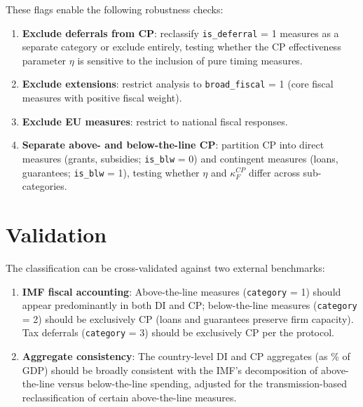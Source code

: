 \documentclass[12pt,a4paper]{article}
\begin{document}
\noindent These flags enable the following robustness checks:

\begin{enumerate}[leftmargin=2em]
  \item \textbf{Exclude deferrals from CP}: reclassify \texttt{is\_deferral} = 1
    measures as a separate category or exclude entirely, testing whether the CP
    effectiveness parameter $\eta$ is sensitive to the inclusion of pure timing
    measures.
  \item \textbf{Exclude extensions}: restrict analysis to
    \texttt{broad\_fiscal} = 1 (core fiscal measures with positive fiscal weight).
  \item \textbf{Exclude EU measures}: restrict to national fiscal responses.
  \item \textbf{Separate above- and below-the-line CP}: partition CP into direct
    measures (grants, subsidies; \texttt{is\_blw} = 0) and contingent measures
    (loans, guarantees; \texttt{is\_blw} = 1), testing whether $\eta$ and
    $\kappa_F^{CP}$ differ across sub-categories.
\end{enumerate}


\section{Validation}

The classification can be cross-validated against two external benchmarks:

\begin{enumerate}[leftmargin=2em]
  \item \textbf{IMF fiscal accounting}: Above-the-line measures
    (\texttt{category} = 1) should appear predominantly in both DI and CP;
    below-the-line measures (\texttt{category} = 2) should be exclusively CP
    (loans and guarantees preserve firm capacity). Tax deferrals
    (\texttt{category} = 3) should be exclusively CP per the protocol.
  \item \textbf{Aggregate consistency}: The country-level DI and CP aggregates
    (as \% of GDP) should be broadly consistent with the IMF's decomposition of
    above-the-line versus below-the-line spending, adjusted for the
    transmission-based reclassification of certain above-the-line measures.
\end{enumerate}
\end{document}
